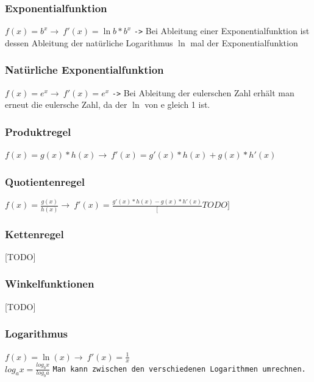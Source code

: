 \documentclass{article}
\begin{document}
	\subsubsection{Exponentialfunktion}
	$f(x)=b^x\to\ f'(x)=\ln b*b^x$ \verb|->| Bei Ableitung einer Exponentialfunktion ist dessen Ableitung der natürliche Logarithmus $\ln$ mal der Exponentialfunktion
	\subsubsection{Natürliche Exponentialfunktion}
	$f(x)=e^x\to\ f'(x)=e^x$ \verb|->| Bei Ableitung der eulerschen Zahl erhält man erneut die eulersche Zahl, da der $\ln$ von e gleich 1 ist. \\
	\subsubsection{Produktregel}
	$f(x)=g(x)*h(x)\to\ f'(x)=g'(x)*h(x)+g(x)*h'(x)$
	\subsubsection{Quotientenregel}
	$f(x)=\frac{g(x)}{h(x)}\to\ f'(x)=\frac{g'(x)*h(x)-g(x)*h'(x)}[TODO]$
	\subsubsection{Kettenregel}
	[TODO]
	\subsubsection{Winkelfunktionen}
	[TODO]
	\subsubsection{Logarithmus}
	$f(x)=\ln(x)\to\ f'(x)=\frac{1}{x}$ \\
	$log_ax=\frac{log_bx}{log_ba}$ \verb|Man kann zwischen den verschiedenen Logarithmen umrechnen.|
\end{document}
